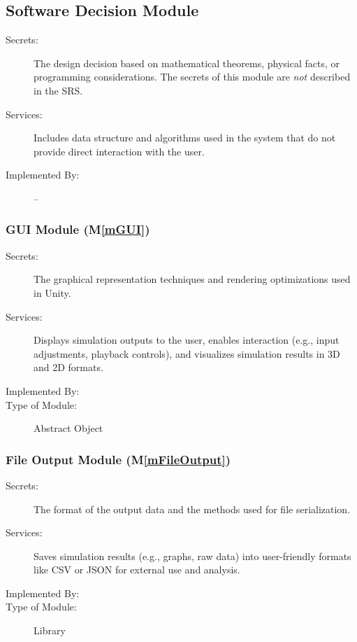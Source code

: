 \documentclass[12pt, titlepage]{article}
\newcommand{\mref}[1]{M\ref{#1}}
\begin{document}
\subsection{Software Decision Module}

\begin{description}
\item[Secrets:] The design decision based on mathematical theorems, physical
  facts, or programming considerations. The secrets of this module are
  \emph{not} described in the SRS.
\item[Services:] Includes data structure and algorithms used in the system that
  do not provide direct interaction with the user. 
\item[Implemented By:] --
\end{description}

\subsubsection{GUI Module (\mref{mGUI})}

\begin{description}
\item[Secrets:] The graphical representation techniques and rendering optimizations used in Unity.
\item[Services:] Displays simulation outputs to the user, enables interaction (e.g., input adjustments, playback controls), and visualizes simulation results in 3D and 2D formats.
\item[Implemented By:] \progname{}
\item[Type of Module:] Abstract Object
\end{description}

\subsubsection{File Output Module (\mref{mFileOutput})}

\begin{description}
\item[Secrets:] The format of the output data and the methods used for file serialization.
\item[Services:] Saves simulation results (e.g., graphs, raw data) into user-friendly formats like CSV or JSON for external use and analysis.
\item[Implemented By:] \progname{}
\item[Type of Module:] Library
\end{description}
\end{document}
